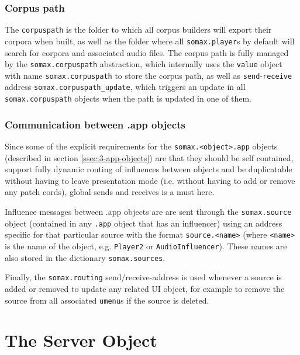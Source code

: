 \subsubsection{Corpus path}
The \texttt{corpuspath} is the folder to which all corpus builders will export their corpora when built, as well as the folder where all \texttt{somax.player}s by default will search for corpora and associated audio files. The corpus path is fully managed by the \texttt{somax.corpuspath} abstraction, which internally uses the \texttt{value} object with name \texttt{somax.corpuspath} to store the corpus path, as well as \texttt{send}-\texttt{receive} address \texttt{somax.corpuspath\_update}, which triggers an update in all \texttt{somax.corpuspath} objects when the path is updated in one of them.


\subsubsection{Communication between .app objects}
Since some of the explicit requirements for the \texttt{somax.<object>.app} objects (described in section \ref{ssec:3-app-objects}) are that they should be self contained, support fully dynamic routing of influences between objects and be duplicatable without having to leave presentation mode (i.e. without having to add or remove any patch cords), global sends and receives is a must here. 

Influence messages between .app objects are are sent through the \texttt{somax.source} object (contained in any \texttt{.app} object that has an influencer) using an address specific for that particular source with the format \texttt{source.<name>} (where \texttt{<name>} is the name of the object, e.g. \texttt{Player2} or \texttt{AudioInfluencer}). These names are also stored in the dictionary \texttt{somax.sources}.

Finally, the \texttt{somax.routing} send/receive-address is used whenever a source is added or removed to update any related UI object, for example to remove the source from all associated \texttt{umenu}s if the source is deleted.


\section{The Server Object}\label{ssec:3-server}

